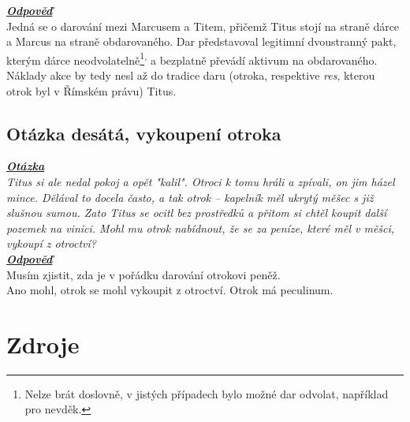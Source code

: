 \documentclass{article}
\begin{document}
\noindent\noindent\textbf{\textit{\underline{Odpověď}}}\\

Jedná se o darování mezi Marcusem a Titem, přičemž Titus stojí na straně dárce a Marcus na straně obdarovaného. Dar představoval legitimní dvoustranný pakt, kterým dárce neodvolatelně\footnote{Nelze brát doslovně, v jistých případech bylo možné dar odvolat, například pro nevděk.}\textsuperscript{,} a bezplatně převádí aktivum na obdarovaného. Náklady akce by tedy nesl až do tradice daru (otroka, respektive \textit{res}, kterou otrok byl v Římském právu) Titus.

\subsection{Otázka desátá, vykoupení otroka}
\textbf{\textit{\underline{Otázka}}}\\
\textit{Titus si ale nedal pokoj a opět "kalil". Otroci k tomu hráli a zpívali, on jim házel mince. Dělával to docela často, a tak otrok – kapelník měl ukrytý měšec s již slušnou sumou. Zato Titus se ocitl bez prostředků a přitom si chtěl koupit další pozemek na vinici. Mohl mu otrok nabídnout, že se za peníze, které měl v měšci, vykoupí z otroctví?}\\

\noindent\noindent\textbf{\textit{\underline{Odpověď}}}\\

Musím zjistit, zda je v pořádku darování otrokovi peněž.\\
Ano mohl, otrok se mohl vykoupit z otroctví.
Otrok má peculinum.

\newpage
\thispagestyle{Contents}
\section*{Zdroje}
\setcounter{SecZdroje}{\thesection}
\addtocounter{SecZdroje}{1}
\printbibliography[type=misc,heading=subbibliography,title={Online zdroje}]
\printbibliography[type=book,heading=subbibliography,title={Knižní zdroje}]
\printbibliography[type=article,heading=subbibliography,title={Články}]
\end{document}
